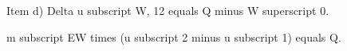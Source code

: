 Item d) Delta u subscript W, 12 equals Q minus W superscript 0.

m subscript EW times (u subscript 2 minus u subscript 1) equals Q.